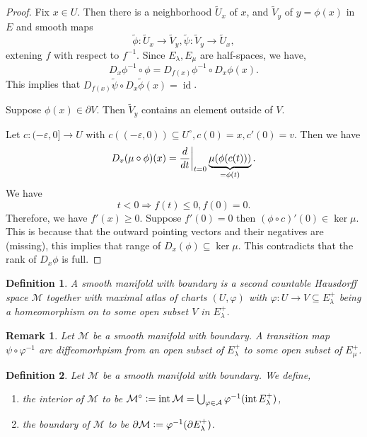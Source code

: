 \documentclass[10pt]{article}
\newtheorem{definition}{Definition}[section]
\newtheorem{remark}{Remark}[section]
\DeclareMathOperator{\interior}{int}
\DeclareMathOperator{\id}{id}
\newcommand{\defeq}{\vcentcolon=}
\newcommand{\M}[0]{\mathcal{M}}
\begin{document}
\begin{proof}
Fix $x\in U$. Then there is a neighborhood $\tilde{U}_x$ of $x$, and $\tilde{V}_y$ of $y = \phi(x)$ in $E$ and smooth maps 
\begin{equation*}
  \tilde{\phi}:\tilde{U}_x\to\tilde{V}_y,\tilde{\psi}:\tilde{V}_y\to\tilde{U}_x,
\end{equation*}
extening $f$ with respect to $f^{-1}$. Since $E_\lambda,E_\mu$ are half-spaces, we have,
\begin{equation*}
  D_x\phi^{-1}\circ\phi = D_{f(x)}\phi^{-1}\circ D_x\phi(x).
\end{equation*}
This implies that $D_{f(x)}\tilde{\psi}\circ D_x\tilde{\phi}(x) = \id$.
\par Suppose $\phi(x)\in\partial V$. Then $\tilde{V}_y$ contains an element outside of $V$. 
\par Let $c:(-\varepsilon,0]\to U$ with $c((-\varepsilon,0))\subseteq U^\circ,c(0) = x, c'(0) = v$. Then we have
\begin{equation*}
  D_v(\mu\circ\phi)(x) = {\frac {d} {dt}}\bigg{|}_{t=0}\underbrace{\mu(\phi(c(t)))}_{=\phi(t)}.
\end{equation*}
We have 
\begin{equation*}
  t<0\Rightarrow f(t)\leq 0, f(0) = 0.
\end{equation*}
Therefore, we have $f'(x)\geq 0$. Suppose $f'(0) = 0$ then $(\phi\circ c)'(0)\in\ker\mu$. This is because that the outward pointing vectors and their negatives are (missing), this implies that 
range of $D_x(\phi)\subseteq\ker\mu$. This contradicts that the rank of $D_x\phi$ is full.
\end{proof}

\begin{definition}
  A smooth manifold with boundary is a second countable Hausdorff space $\M$ together with maximal atlas of charts $(U,\varphi)$ with $\varphi:U\to V\subseteq E_\lambda^+$ being a homeomorphism on to some open subset $V$ in $E_\lambda^+$.
\end{definition}

\begin{remark}
  Let $\M$ be a smooth manifold with boundary. A transition map $\psi\circ\varphi^{-1}$ are diffeomorhpism from an open subset of $E_\lambda^+$ to some open subset of $E_\mu^+$.
\end{remark}

\begin{definition}
  Let $\M$ be a smooth manifold with boundary. We define,
  \begin{enumerate}[1).]
    \item the interior of $\M$ to be $\M^\circ\defeq\interior\M = \bigcup_{\varphi\in\mathcal{A}}\varphi^{-1}(\interior E_\lambda^+)$,
    \item the boundary of $\M$ to be $\partial\M\defeq \varphi^{-1}(\partial E_\lambda^+)$.
  \end{enumerate}
\end{definition}
\end{document}
